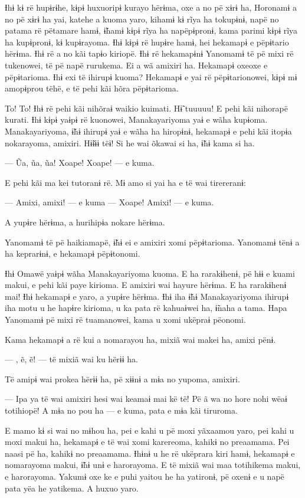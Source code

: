 Ɨhɨ kɨ rë hupɨrɨhe, kɨpɨ huxuoripɨ kurayo hërɨma, oxe a no pë xɨrɨ ha,
Horonamɨ a no pë xɨrɨ ha yai, katehe a kuoma yaro, kihamɨ kɨ rĩya ha
tokupɨnɨ, napë no patama rë pëtamare hamɨ, ɨ̃hamɨ kɨpɨ rĩya ha
napëpɨpronɨ, kama parimi kɨpɨ rĩya ha kupɨpronɨ, kɨ kupɨrayoma. Ɨhɨ kɨpɨ
rë hupɨre hamɨ, hei hekamapɨ e pëpɨtario hërɨma. Ɨhɨ rë a no kãi tapɨo
kiriopë. Ɨhɨ rë hekamapɨnɨ Yanomamɨ të pë mixi rë tukenowei, të pë napë
rurukema. Ei a wã amixiri ha. Hekamapɨ oxeoxe e pëpɨtarioma. Ɨhɨ exi të
ihirupɨ kuoma? Hekamapɨ e yai rë pëpɨtarionowei, kɨpɨ mɨ amopɨprou tëhë,
e të pehi kãi hõra pëpɨtarioma. 

To! To! Ɨhɨ rë pehi kãi nihõraɨ waikio kuimati. Hɨ̃ tuuuuu! E pehi kãi
nihorapë kurati. Ɨhɨ kɨpɨ yaɨpɨ rë kuonowei, Manakayariyoma yaɨ e wãha
kupɨoma. Manakayariyoma, ɨ̃hɨ ihirupɨ yaɨ e wãha ha hiropɨnɨ, hekamapɨ e
pehi kãi itopɨa nokarayoma, amixiri. Hɨ̃ɨɨɨ tëɨ! Si he wai õkawai si ha,
ɨ̃hɨ kama si ha. 

--- Ũa, ũa, ũa! Xoape! Xoape! --- e kuma. 

E pehi kãi ma kei tutoranɨ rë. Mɨ amo si yai ha e të wai tirereranɨ:

--- Amixi, amixi! --- e kuma --- Xoape! Amixi! --- e kuma. 

A yupɨre hërɨma, a hurihipɨa nokare hërɨma. 

Yanomamɨ të pë haikiamapë, ɨ̃hɨ ei e amixiri xomi pëpɨtarioma. Yanomamɨ
tënɨ a ha keprarɨnɨ, e hekamapɨ pëpɨtonomi. 

Ɨhɨ Omawë yaɨpɨ wãha Manakayariyoma kuoma. E ha rarakɨhenɨ, pë hɨɨ e
kuami makui, e pehi kãi paye kirioma. E amixiri wai hayure hërɨma. E ha
rarakɨhenɨ mai! Ɨhɨ hekamapɨ e yaro, a yupɨre hërɨma. Ɨhɨ iha ɨ̃hɨ
Manakayariyoma ihirupɨ iha motu u he hapɨre kirioma, u ka pata rë
kahuaɨwei ha, ɨ̃naha a tama. Hapa Yanomamɨ pë mixi rë tuamanowei, kama u
xomi ukëpraɨ pëonomi. 

Kama hekamapɨ a rë kui a nomarayou ha, mixiã wai makei ha, amixi pënɨ. 

--- , ẽ, ẽ! --- të mixiã wai ku hërɨɨ ha. 

Të amipɨ wai prokea hërɨɨ ha, pë xɨɨnɨ a mɨa no yupoma, amixiri. 

--- Ipa ya të wai amixiri hesi wai keamaɨ mai kë të! Pë ã wa no hore nohi
wëaɨ totihiopë! A mɨa no pou ha --- e kuma, pata e mɨa kãi tiruroma. 

E mamo kɨ si wai no mɨhou ha, pei e kahi u pë moxi yãxaamou yaro, pei
kahi u moxi makui ha, hekamapɨ e të wai xomi karereoma, kahikɨ no
preaamama. Pei naasi pë ha, kahikɨ no preaamama. Ɨhɨnɨ u he rë ukëprara
kiri hamɨ, hekamapɨ e nomarayoma makui, ɨ̃hɨ unɨ e harorayoma. E të mixiã
wai maa totihikema makui, e harorayoma. Yakumɨ oxe ke e puhi yaitou he
ha yatironɨ, pë oxenɨ e u napë pata yëa he yatikema. A huxuo yaro. 


